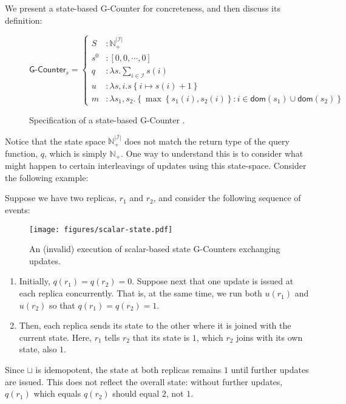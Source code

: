 We present a state-based G-Counter \CRDT for concreteness, and then discuss its
definition:

\begin{figure}[H]
  \centering
  \[
    \textsf{G-Counter}_s = \left\{\begin{aligned}
      S &: \mathbb{N}_+^{|\mathcal{I}|} \\
      s^0 &: \left[ 0, 0, \cdots, 0 \right] \\
      q &: \lambda s. \sum_{i \in \mathcal{I}} s(i) \\
      u &: \lambda s,i. s\left\{ i \mapsto s(i) + 1 \right\} \\
      m &: \lambda s_1, s_2. \left\{ \max\left\{ s_1(i), s_2(i) \right\}: i \in \mathsf{dom}(s_1) \cup
      \mathsf{dom}(s_2) \right\}
    \end{aligned}\right.
  \]
  \caption{Specification of a state-based \textsf{G-Counter} \CRDT.}
  \label{fig:state-gcounter}
\end{figure}

Notice that the state space $\mathbb{N}^{|\mathcal{I}|}_+$ does not match the
return type of the query function, $q$, which is simply $\mathbb{N}_+$. One way
to understand this is to consider what might happen to certain interleavings of
updates using this state-space. Consider the following example:

\begin{example}
  \label{example:vector-state-counter}
  Suppose we have two replicas, $r_1$ and $r_2$, and consider the following
  sequence of events:

  \begin{figure}[H]
    \centering
    \texttt{[image: figures/scalar-state.pdf]}
    \caption{An (invalid) execution of scalar-based state G-Counters exchanging
      updates.}
  \end{figure}

  \begin{enumerate}
    \item Initially, $q(r_1) = q(r_2) = 0$. Suppose next that one update is
      issued at each replica concurrently. That is, at the same time, we run
      both $u(r_1)$ and $u(r_2)$ so that $q(r_1) = q(r_2) = 1$.
    \item Then, each replica sends its state to the other where it is joined
      with the current state. Here, $r_1$ tells $r_2$ that its state is $1$,
      which $r_2$ joins with its own state, also $1$.
  \end{enumerate}

  Since $\sqcup$ is idemopotent, the state at both replicas remains $1$ until
  further updates are issued. This does not reflect the overall state: without
  further updates, $q(r_1)$ which equals $q(r_2)$ should equal $2$, not $1$.
\end{example}

